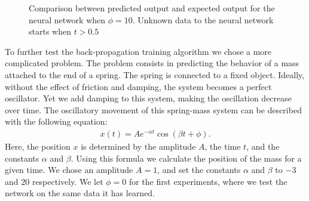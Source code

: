\documentclass[11pt]{article}
\begin{document}
\begin{figure}[]
	\centering
	\caption{Comparison between predicted output and expected output for the neural network when $\phi=10$. Unknown data to the neural network starts when $t > 0.5$}	\label{fig:bpgt-3.0_damping_test_output_phi_we}	
\end{figure}

To further test the back-propagation training algorithm we chose a more complicated problem. The problem consists in predicting the
behavior of a mass attached to the end of a spring. The spring is connected to a fixed object. Ideally, without the effect of friction
and damping, the system becomes a perfect oscillator. Yet we add damping to this system, making the oscillation decrease over time. The
oscillatory movement of this spring-mass system can be described with the following equation:
\begin{eqnarray}\label{eqn:damping}
	x(t) = Ae^{-\alpha t}\cos{(\beta t+\phi)}.
\end{eqnarray}
Here, the position $x$ is determined by the amplitude $A$, the time $t$, and the constants $\alpha$ and $\beta$. Using this formula we
calculate the position of the mass for a given time. We chose an amplitude $A=1$, and set the constants $\alpha$ and $\beta$ to $-3$
and $20$ respectively. We let $\phi=0$ for the first experiments, where we test the network on the same data it has learned.
\end{document}

